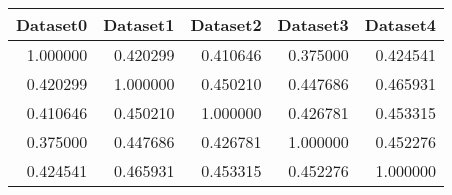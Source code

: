 \begin{tabular}{rrrrr}
\toprule
 Dataset0 &  Dataset1 &  Dataset2 &  Dataset3 &  Dataset4 \\
\midrule
 1.000000 &  0.420299 &  0.410646 &  0.375000 &  0.424541 \\
 0.420299 &  1.000000 &  0.450210 &  0.447686 &  0.465931 \\
 0.410646 &  0.450210 &  1.000000 &  0.426781 &  0.453315 \\
 0.375000 &  0.447686 &  0.426781 &  1.000000 &  0.452276 \\
 0.424541 &  0.465931 &  0.453315 &  0.452276 &  1.000000 \\
\bottomrule
\end{tabular}
